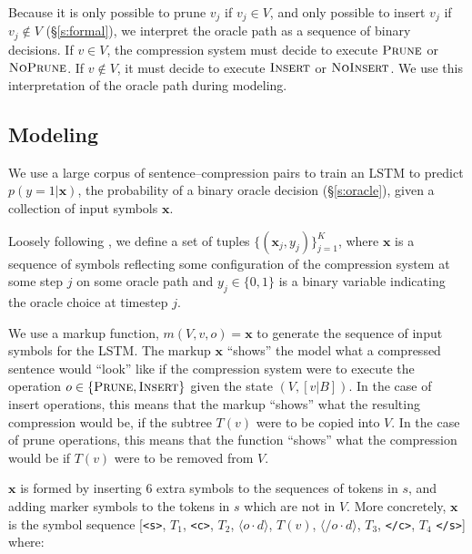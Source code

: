 \documentclass[11pt,a4paper]{article}
\begin{document}
Because it is only possible to prune $v_j$ if $v_j \in V$, and only possible to insert $v_j$ if $v_j \notin V$ (\S\ref{s:formal}), we interpret the oracle path as a sequence of binary decisions. If $v \in V$, the compression system must decide to execute $\textsc{Prune}$ or $\textsc{NoPrune}$. If $v \notin V$, it must decide to execute $\textsc{Insert}$ or $\textsc{NoInsert}$. We use this interpretation of the oracle path during modeling.


\subsection{Modeling}\label{s:modeling}

We use a large corpus of sentence--compression pairs \cite{filippova2013overcoming} to train an LSTM to predict $p(y=1 | \bm{x})$, the probability of a binary oracle decision (\S\ref{s:oracle}), given a collection of input symbols $\bm{x}$. 

Loosely following \citet{D14-1082}, we define a set of tuples $\{(\bm{x}_j, y_j) \}_{j=1}^{K}$, where $\bm{x}$ is a sequence of symbols reflecting some configuration of the compression system at some step $j$ on some oracle path and $y_j \in \{0,1\}$ is a binary variable indicating the oracle choice at timestep $j$. 

We use a markup function, $m(V,v,o)=\bm{x}$ to generate the sequence of input symbols for the LSTM. The markup $\bm{x}$ ``shows'' the model what a compressed sentence would ``look'' like if the compression system were to execute the operation $o \in \{\textsc{Prune}, \textsc{Insert}\}$ given the state $(V, [v|B])$. In the case of insert operations, this means that the markup ``shows'' what the resulting compression would be, if the subtree $T(v)$ were to be copied  into $V$. In the case of prune operations, this means that the function ``shows'' what the compression would be if $T(v)$ were to be removed from $V$.

$\bm{x}$ is formed by inserting 6 extra symbols to the sequences of tokens in $s$, and adding marker symbols to the tokens in $s$ which are not in $V$. More concretely, $\bm{x}$ is the symbol sequence [\texttt{<s>}, $T_1$, \texttt{<c>}, $T_2$, $\langle o \cdot d \rangle$,  $T(v)$,  $\langle / o \cdot d \rangle$, $T_3$, \texttt{</c>}, $T_4$ \texttt{</s>}] where:
\end{document}
